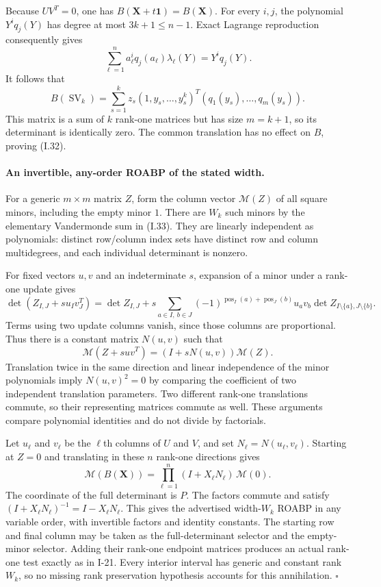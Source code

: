\documentclass[11pt,a4paper]{article}
\theoremstyle{definition}\newtheorem{definition}{Definition}
\begin{document}
Because $UV^T=0$, one has $B(\mathbf X+t\mathbf1)=B(\mathbf X)$.
For every $i,j$, the polynomial $Y^i q_j(Y)$ has degree at most
$3k+1\le n-1$.  Exact Lagrange reproduction consequently gives
\[
 \sum_{\ell=1}^n a_\ell^i q_j(a_\ell)\lambda_\ell(Y)
    =Y^i q_j(Y).
\]
It follows that
\[
 B(\operatorname{SV}_k)
   =\sum_{s=1}^k z_s
       (1,y_s,\ldots,y_s^k)^T
       (q_1(y_s),\ldots,q_m(y_s)).
\]
This matrix is a sum of $k$ rank-one matrices but has size
$m=k+1$, so its determinant is identically zero.  The common
translation has no effect on $B$, proving (I.32).

\paragraph{An invertible, any-order ROABP of the stated width.}
For a generic $m\times m$ matrix $Z$, form the column vector
$\mathcal M(Z)$ of all square minors, including the empty
minor $1$.  There are $W_k$ such minors by the elementary
Vandermonde sum in (I.33).  They are linearly independent as
polynomials: distinct row/column index sets have distinct
row and column multidegrees, and each individual determinant
is nonzero.

For fixed vectors $u,v$ and an indeterminate $s$, expansion
of a minor under a rank-one update gives
\[
 \det(Z_{I,J}+s u_Iv_J^T)
 =\det Z_{I,J}
  +s\sum_{a\in I,\ b\in J}
        (-1)^{\operatorname{pos}_I(a)+\operatorname{pos}_J(b)}
        u_av_b\det Z_{I\setminus\{a\},J\setminus\{b\}}.
\]
Terms using two update columns vanish, since those columns are
proportional.  Thus there is a constant matrix $N(u,v)$ such that
\[
 \mathcal M(Z+suv^T)=(I+sN(u,v))\mathcal M(Z).
\]
Translation twice in the same direction and linear independence
of the minor polynomials imply $N(u,v)^2=0$ by comparing the
coefficient of two independent translation parameters.  Two
different rank-one translations commute, so their representing
matrices commute as well.  These arguments compare polynomial
identities and do not divide by factorials.

Let $u_\ell$ and $v_\ell$ be the $\ell$th columns of $U$ and
$V$, and set $N_\ell=N(u_\ell,v_\ell)$.  Starting at $Z=0$
and translating in these $n$ rank-one directions gives
\[
 \mathcal M(B(\mathbf X))
     =\prod_{\ell=1}^n(I+X_\ell N_\ell)\,\mathcal M(0).
\]
The coordinate of the full determinant is $P$.  The factors
commute and satisfy
$(I+X_\ell N_\ell)^{-1}=I-X_\ell N_\ell$.
This gives the advertised width-$W_k$ ROABP in any variable
order, with invertible factors and identity constants.
The starting row and final column may be taken as the
full-determinant selector and the empty-minor selector.
Adding their rank-one endpoint matrices produces an actual
rank-one test exactly as in I-21.  Every interior interval
has generic and constant rank $W_k$, so no missing rank
preservation hypothesis accounts for this annihilation.
\hfill$\square$
\end{document}

